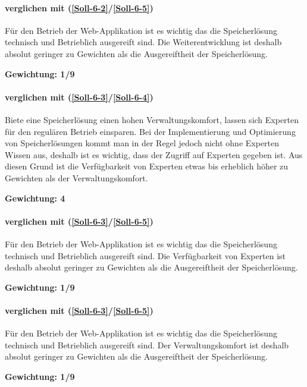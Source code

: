 \paragraph*{ verglichen mit  (\ref{Soll-6-2}/\ref{Soll-6-5})}
Für den Betrieb der Web-Applikation ist es wichtig das die Speicherlösung technisch und Betrieblich ausgereift sind. Die Weiterentwicklung ist deshalb absolut geringer zu Gewichten als die Ausgereiftheit der Speicherlösung.

\textbf{Gewichtung: 1/9}


\paragraph*{ verglichen mit  (\ref{Soll-6-3}/\ref{Soll-6-4})}
Biete eine Speicherlösung einen hohen Verwaltungskomfort, lassen sich Experten für den regulären Betrieb einsparen. Bei der Implementierung und Optimierung von Speicherlösungen kommt man in der Regel jedoch nicht ohne Experten Wissen aus, deshalb ist es wichtig, dass der Zugriff auf Experten gegeben ist. Aus diesen Grund ist die  Verfügbarkeit von Experten etwas bis erheblich höher zu Gewichten als der Verwaltungskomfort. 

\textbf{Gewichtung: 4}

\paragraph*{ verglichen mit  (\ref{Soll-6-3}/\ref{Soll-6-5})}
Für den Betrieb der Web-Applikation ist es wichtig das die Speicherlösung technisch und Betrieblich ausgereift sind. Die Verfügbarkeit von Experten ist deshalb absolut geringer zu Gewichten als die Ausgereiftheit der Speicherlösung.

\textbf{Gewichtung: 1/9}

\paragraph*{ verglichen mit  (\ref{Soll-6-3}/\ref{Soll-6-5})}
Für den Betrieb der Web-Applikation ist es wichtig das die Speicherlösung technisch und Betrieblich ausgereift sind. Der Verwaltungskomfort ist deshalb absolut geringer zu Gewichten als die Ausgereiftheit der Speicherlösung.

\textbf{Gewichtung: 1/9}

